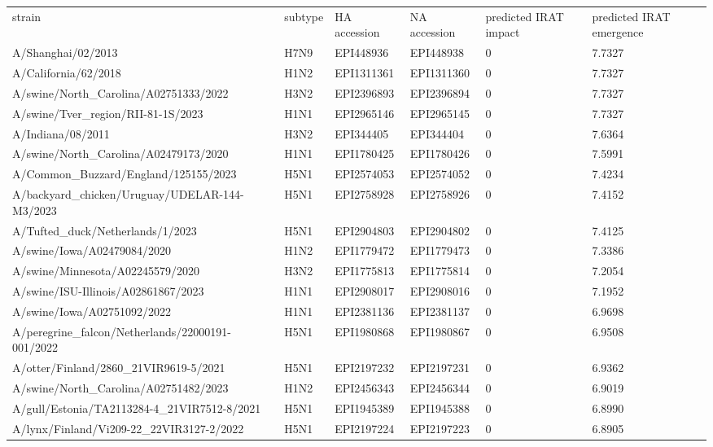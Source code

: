 \begin{tabular}{L{1.95in}|L{.25in}|L{.60in}|L{.6in}|C{1in}|C{1in}}\hline
strain&subtype& HA  accession & NA  accession & predicted  IRAT  impact & predicted  IRAT  emergence \\
A/Shanghai/02/2013&H7N9&EPI448936&EPI448938&0&7.7327\\
A/California/62/2018&H1N2&EPI1311361&EPI1311360&0&7.7327\\
A/swine/North\_Carolina/A02751333/2022&H3N2&EPI2396893&EPI2396894&0&7.7327\\
A/swine/Tver\_region/RII-81-1S/2023&H1N1&EPI2965146&EPI2965145&0&7.7327\\
A/Indiana/08/2011&H3N2&EPI344405&EPI344404&0&7.6364\\
A/swine/North\_Carolina/A02479173/2020&H1N1&EPI1780425&EPI1780426&0&7.5991\\
A/Common\_Buzzard/England/125155/2023&H5N1&EPI2574053&EPI2574052&0&7.4234\\
A/backyard\_chicken/Uruguay/UDELAR-144-M3/2023&H5N1&EPI2758928&EPI2758926&0&7.4152\\
A/Tufted\_duck/Netherlands/1/2023&H5N1&EPI2904803&EPI2904802&0&7.4125\\
A/swine/Iowa/A02479084/2020&H1N2&EPI1779472&EPI1779473&0&7.3386\\
A/swine/Minnesota/A02245579/2020&H3N2&EPI1775813&EPI1775814&0&7.2054\\
A/swine/ISU-Illinois/A02861867/2023&H1N1&EPI2908017&EPI2908016&0&7.1952\\
A/swine/Iowa/A02751092/2022&H1N1&EPI2381136&EPI2381137&0&6.9698\\
A/peregrine\_falcon/Netherlands/22000191-001/2022&H5N1&EPI1980868&EPI1980867&0&6.9508\\
A/otter/Finland/2860\_21VIR9619-5/2021&H5N1&EPI2197232&EPI2197231&0&6.9362\\
A/swine/North\_Carolina/A02751482/2023&H1N2&EPI2456343&EPI2456344&0&6.9019\\
A/gull/Estonia/TA2113284-4\_21VIR7512-8/2021&H5N1&EPI1945389&EPI1945388&0&6.8990\\
A/lynx/Finland/Vi209-22\_22VIR3127-2/2022&H5N1&EPI2197224&EPI2197223&0&6.8905\\

\end{tabular}
